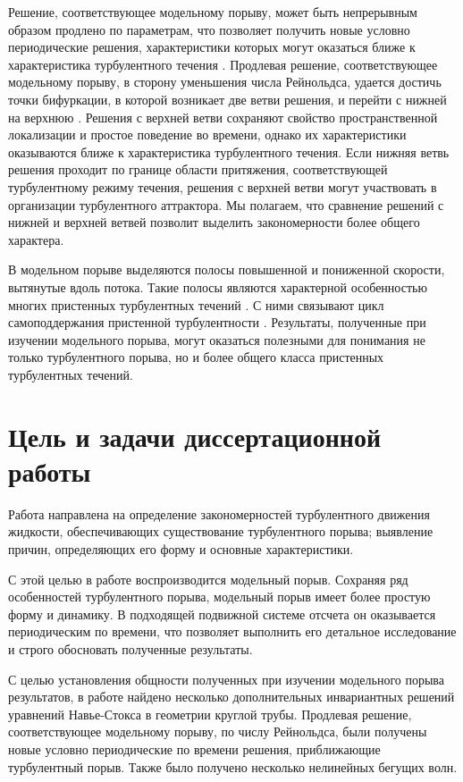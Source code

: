 Решение, соответствующее модельному порыву, может быть непрерывным образом продлено по параметрам, что позволяет получить новые условно периодические решения, характеристики которых могут оказаться ближе к характеристика турбулентного течения \cite{Viswanath2007, Dijkstra2014}. Продлевая решение, соответствующее модельному порыву, в сторону уменьшения числа Рейнольдса, удается достичь точки бифуркации, в которой возникает две ветви решения, и перейти с нижней на верхнюю \cite{Avila2013}. Решения с верхней ветви сохраняют свойство пространственной локализации и простое поведение во времени, однако их характеристики оказываются ближе к характеристика турбулентного течения. Если нижняя ветвь решения проходит по границе области притяжения, соответствующей турбулентному режиму течения, решения с верхней ветви могут участвовать в организации турбулентного аттрактора. Мы полагаем, что сравнение решений с нижней и верхней ветвей позволит выделить закономерности более общего характера. 

В модельном порыве выделяются полосы повышенной и пониженной скорости, вытянутые вдоль потока. Такие полосы являются характерной особенностью многих пристенных турбулентных течений \cite{Klebanoff1962, Kline1967}. С ними связывают цикл самоподдержания пристенной турбулентности \cite{Hamilton1995, Waleffe1997, Schoppa2002}. Результаты, полученные при изучении модельного порыва, могут оказаться полезными для понимания не только турбулентного порыва, но и более общего класса пристенных турбулентных течений. 


\section{Цель и задачи диссертационной работы}

Работа направлена на определение закономерностей турбулентного движения жидкости, обеспечивающих существование турбулентного порыва; выявление причин, определяющих его форму и основные характеристики. 

С этой целью в работе воспроизводится модельный порыв. Сохраняя ряд особенностей турбулентного порыва, модельный порыв имеет более простую форму и динамику. В подходящей подвижной системе отсчета он оказывается периодическим по времени, что позволяет выполнить его детальное исследование и строго обосновать полученные результаты. 

С целью установления общности полученных при изучении модельного порыва результатов, в работе найдено несколько дополнительных инвариантных решений уравнений Навье-Стокса в геометрии круглой трубы. Продлевая решение, соответствующее модельному порыву, по числу Рейнольдса, были получены новые условно периодические по времени решения, приближающие турбулентный порыв. Также было получено несколько нелинейных бегущих волн. 


